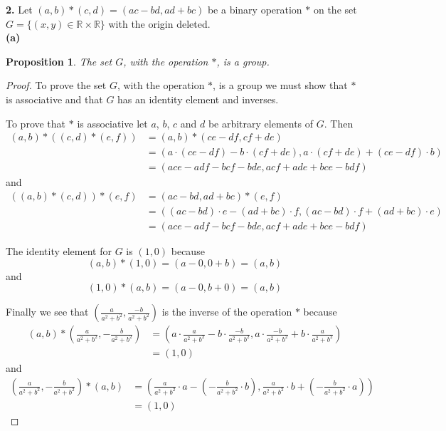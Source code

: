 \documentclass[12pt]{article}   %
\newtheorem*{proposition}{Proposition}  %
\begin{document}
\noindent\textbf{2.} \quad Let $(a,b)*(c,d) = (ac - bd, ad + bc)$ be a binary operation $*$ on the set $G = \{(x,y) \in \mathbb{R} \times \mathbb{R}\}$ with the origin deleted. \\

\noindent\textbf{(a)}
\begin{proposition}
The set $G$, with the operation $\ast$, is a group.
\end{proposition}
\begin{proof}
To prove the set $G$, with the operation $\ast$, is a group we must show that $\ast$ is associative and that $G$ has an identity element and inverses.

To prove that $*$ is associative let $a$, $b$, $c$ and $d$ be arbitrary elements of $G$. Then
\begin{align*}
(a,b) * ((c,d) * (e,f)) &= (a,b) * (ce - df, cf + de) \\
&= (a \cdot (ce - df) - b \cdot (cf + de), a \cdot (cf + de) + (ce - df) \cdot b) \\
&= (ace - adf - bcf - bde, acf + ade + bce - bdf)
\end{align*}
and
\begin{align*}
((a,b) * (c,d)) * (e,f) &= (ac - bd, ad + bc) * (e,f) \\
&= ((ac - bd) \cdot e - (ad + bc) \cdot f, (ac - bd) \cdot f + (ad + bc) \cdot e) \\
&= (ace - adf - bcf - bde, acf + ade + bce - bdf)
\end{align*}

The identity element for $G$ is $(1,0)$ because
\begin{equation*}
(a,b) * (1,0) = (a - 0, 0 + b) = (a,b)
\end{equation*}
and
\begin{equation*}
(1,0) * (a,b) = (a - 0, b + 0) = (a,b)
\end{equation*}

Finally we see that $(\tfrac{a}{a^2 + b^2}, \tfrac{-b}{a^2 + b^2})$ is the inverse of the operation $\ast$ because
\begin{align*}
(a,b) * \left( \frac{a}{a^2 + b^2}, -\frac{b}{a^2 + b^2} \right) &= \left( a \cdot \frac{a}{a^2 + b^2} - b \cdot \frac{-b}{a^2 + b^2}, a \cdot \frac{-b}{a^2 + b^2} + b \cdot \frac{a}{a^2 + b^2} \right) \\
&= (1,0)
\end{align*}
and
\begin{align*}
 \left( \frac{a}{a^2 + b^2}, -\frac{b}{a^2 + b^2} \right) * (a,b) &= \left(\frac{a}{a^2 + b^2} \cdot a - \left(-\frac{b}{a^2 + b^2} \cdot b \right), \frac{a}{a^2 + b^2} \cdot b + \left( -\frac{b}{a^2 + b^2} \cdot a \right) \right) \\
&= (1,0)
\end{align*}
\end{proof}
\end{document}
